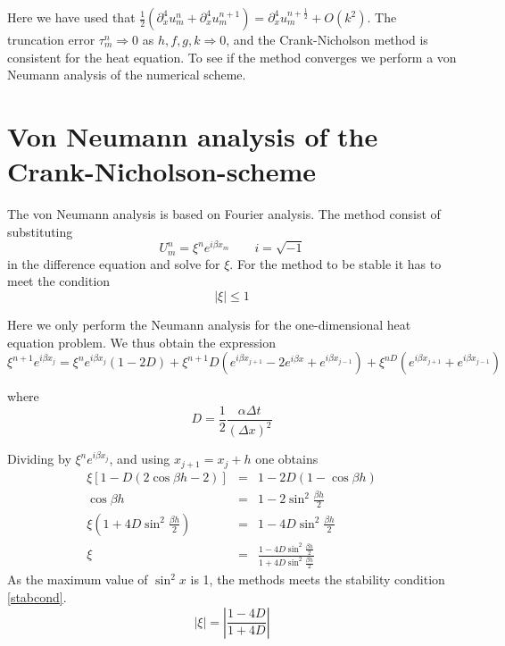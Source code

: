 Here we have used that $\frac{1}{2}(\partial_x^4 u_m^n + \partial_x^4 u_m^{n+1}) = \partial_x^4 u_m^{n+\frac{1}{2}} + O(k^2)$. 
The truncation error $\tau_m^n \Rightarrow 0$ as $h,f,g,k \Rightarrow 0$, and the Crank-Nicholson method is consistent for the heat equation. To see if the method converges we perform a von Neumann analysis of the numerical scheme.

\section{Von Neumann analysis of the Crank-Nicholson-scheme}

The von Neumann analysis is based on Fourier analysis. The method consist of substituting 
\begin{equation*}
	U_m^n=\xi^n e^{i \beta x_m} \quad \quad  i=\sqrt{-1}
\end{equation*}
in the difference equation and solve for $\xi$.
For the method to be stable it has to meet the condition
\begin{equation}
	\mid{\xi}\mid \leq 1
	\label{stabcond}
\end{equation}

Here we only perform the Neumann analysis for the one-dimensional heat equation problem. We thus obtain the expression
\begin{equation*}
\xi^{n+1} e^{i\beta x_{j}} = \xi^{n} e^{i\beta x_j}\left(1-2D\right) + \xi^{n+1}D\left(e^{i\beta x_{j+1}} - 2e^{i\beta  x} + e^{i\beta x_{j-1}}\right) + \xi^{nD}\left(e^{i\beta x_{j+1}} + e^{i\beta x_{j-1}}\right)
\end{equation*}

where
\begin{equation*}
D = \frac{1}{2}\frac{\alpha\Delta t}{(\Delta x)^2}
\label{eq:crank-D}
\end{equation*}

Dividing  by $\xi^ne^{i\beta x_j}$, and using $x_{j+1} = x_j + h$ one obtains    %
\begin{eqnarray*}
\xi\left[1-D\left(2\cos{\beta h} - 2\right)\right] &=& 1 - 2D\left(1-\cos{\beta h}\right) \\
\cos{\beta h} &=& 1-2\sin^2{\frac{\beta h}{2}} \\
\xi\left(1+4D\sin^{2}{\frac{\beta h}{2}}\right) &=& 1 - 4D\sin^2{\frac{\beta h}{2}} \\
\xi &=& \frac{1-4D\sin^2{\frac{\beta h}{2}}}{1+4D\sin^2{\frac{\beta h}{2}}}
\end{eqnarray*}
As the maximum value of $\sin^2{x}$ is 1, the methods meets the stability condition \ref{stabcond}.
\begin{equation}
|\xi | = \left|\frac{1-4D}{1+4D}\right|
\end{equation}

